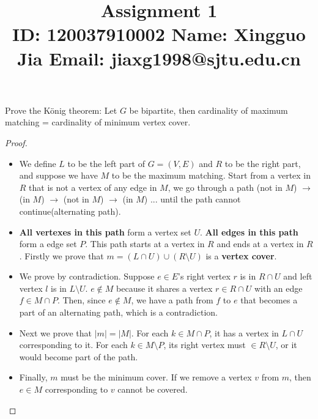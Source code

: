 \documentclass{article}
\title{{\bf Assignment 1} \\ {\large ID: 120037910002 } {\large Name: Xingguo Jia } {\large Email: jiaxg1998@sjtu.edu.cn}}
\author{}
\date{}
\newcounter{exercise}
\newcommand{\<}{
    \langle}
\renewcommand{\>}{
    \rangle}
\begin{document}
\maketitle


{\large





\begin{exercise}
Prove the K\"onig theorem: Let $G$ be bipartite, then cardinality of maximum matching = cardinality of minimum vertex cover.

\end{exercise}
\begin{proof} 
    \leavevmode\newline
\begin{itemize}

\item We define $L$ to be the left part of $G=(V,E)$ and $R$ to be the right part, and suppose we have $M$ to be the maximum matching. Start from a vertex in $R$ that is not a vertex of any edge in $M$, we go through a path (not in $M$) $\rightarrow$ (in $M$) $\rightarrow$  (not in $M$) $\rightarrow$ (in $M$) ... until the path cannot continue(alternating path). 

\item \textbf{All vertexes in this path } form a vertex set $U$. \textbf{All edges in this path} form a edge set $P$. This path starts at a vertex in $R$ and ends at a vertex in $R$. Firstly we prove that $m=(L \cap U) \cup (R \setminus U)$ is a \textbf{vertex cover}.

\item We prove by contradiction. Suppose $e \in E$'s right vertex $r$ is in $R\cap U$ and left vertex $l$ is in $L\setminus U$. $e\notin M$ because it shares a vertex $r\in R\cap U$ with an edge $f\in M \cap P$. Then, since $e \notin M$, we have a path from $f$ to $e$ that becomes a part of an alternating path, which is a contradiction.

\item Next we prove that $|m| = |M|$. For each $k \in M \cap P$, it has a vertex in $L\cap U$ corresponding to it. For each $k \in M \setminus P$, its right vertex must $\in R \setminus U$, or it would become part of the path.

\item Finally, $m$ must be the minimum cover. If we remove a vertex $v$ from $m$, then $e \in M$ corresponding to $v$ cannot be covered. 
\end{itemize}
\end{proof}


}
\end{document}
